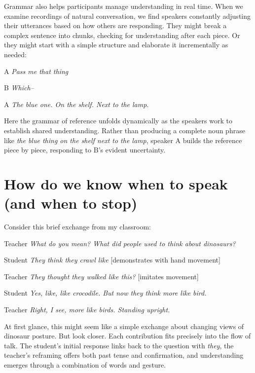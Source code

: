 Grammar also helps participants manage understanding in real time. When we examine recordings of natural conversation, we find speakers constantly adjusting their utterances based on how others are responding. They might break a complex sentence into chunks, checking for understanding after each piece. Or they might start with a simple structure and elaborate it incrementally as needed:

\ea
\begin{dialogue}
\item[A] \textit{Pass me that thing}
\item[B] \textit{Which--}
\item[A] \textit{The blue one. On the shelf. Next to the lamp.}
\end{dialogue}
\z
Here the grammar of reference unfolds dynamically as the speakers work to establish shared understanding. Rather than producing a complete noun phrase like \textit{the blue thing on the shelf next to the lamp}, speaker A builds the reference piece by piece, responding to B's evident uncertainty.

\section{How do we know when to speak (and when to stop)} \label{sec:turn-arch}

Consider this brief exchange from my classroom:

\ea
\begin{dialogue}
\item[Teacher] \textit{What do you mean? What did people used to think about dinosaurs?}
\item[Student] \textit{They think they crawl like} [demonstrates with hand movement]
\item[Teacher] \textit{They thought they walked like this?} [imitates movement]
\item[Student] \textit{Yes, like, like crocodile. But now they think more like bird.}
\item[Teacher] \textit{Right, I see, more like birds. Standing upright.}
\end{dialogue}
\z
At first glance, this might seem like a simple exchange about changing views of dinosaur posture. But look closer. Each contribution fits precisely into the flow of talk. The student's initial response links back to the question with \textit{they}, the teacher's reframing offers both past tense and confirmation, and understanding emerges through a combination of words and gesture.

